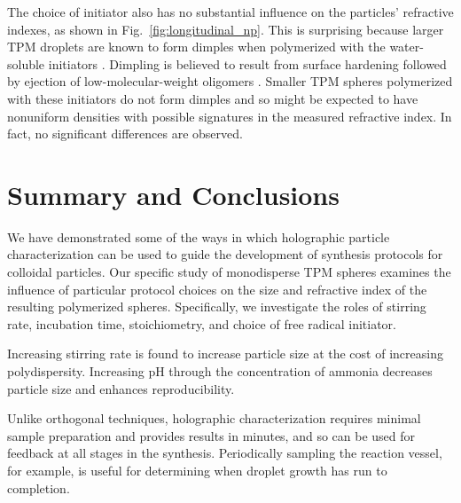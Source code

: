 \documentclass[journal=langd5,manuscript=article,layout=twocolumn]{achemso}
\begin{document}


The choice of initiator also has no substantial
influence on the particles' refractive indexes,
as shown in Fig.~\ref{fig:longitudinal_np}.
This is surprising because
larger TPM droplets are known to form dimples when polymerized
with the water-soluble initiators \cite{sacanna11}.
Dimpling is believed to result from
surface hardening followed by
ejection of low-molecular-weight oligomers \cite{sacanna11}.
Smaller TPM spheres polymerized with these
initiators do not form dimples and so might 
be expected to have nonuniform densities
with possible signatures in the measured refractive
index.  In fact, no significant differences are observed.

\section{Summary and Conclusions}
\label{sec:discussion}

We have demonstrated some of the ways in which 
holographic particle characterization
can be used to guide the development of synthesis
protocols for colloidal particles.
Our specific study of monodisperse TPM spheres
examines the influence of particular protocol
choices on the size and refractive index of 
the resulting polymerized spheres. Specifically,
we investigate the roles of stirring rate, 
incubation time, stoichiometry, and choice of
free radical initiator.

Increasing stirring rate is found to increase particle
size at the cost of increasing polydispersity.
Increasing pH through the concentration of ammonia 
decreases particle size and enhances 
reproducibility.

Unlike orthogonal techniques, holographic characterization requires minimal
sample preparation and provides results in minutes,
and so can be used for feedback at all stages in
the synthesis.
Periodically sampling the reaction vessel, for example, 
is useful for determining when droplet growth has
run to completion.
\end{document}
